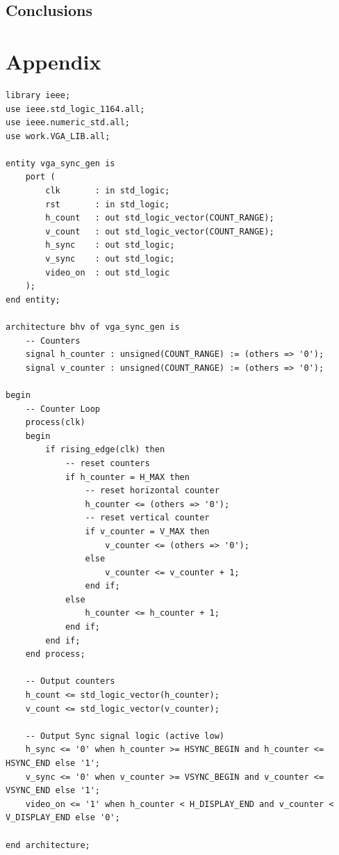 \documentclass{article}
\begin{document}
\subsection*{Conclusions}

\section*{Appendix}

\begin{lstlisting}[caption=VGA Sync Generator for Part 2, label=lst:vga-sync-gen-part-2]
library ieee;
use ieee.std_logic_1164.all;
use ieee.numeric_std.all;
use work.VGA_LIB.all;

entity vga_sync_gen is
    port (
        clk       : in std_logic;
        rst       : in std_logic;
        h_count   : out std_logic_vector(COUNT_RANGE);
        v_count   : out std_logic_vector(COUNT_RANGE);
        h_sync    : out std_logic;
        v_sync    : out std_logic;
        video_on  : out std_logic
    );
end entity;

architecture bhv of vga_sync_gen is
    -- Counters
    signal h_counter : unsigned(COUNT_RANGE) := (others => '0');
    signal v_counter : unsigned(COUNT_RANGE) := (others => '0');

begin
    -- Counter Loop
    process(clk)
    begin
        if rising_edge(clk) then
            -- reset counters
            if h_counter = H_MAX then
                -- reset horizontal counter
                h_counter <= (others => '0');
                -- reset vertical counter
                if v_counter = V_MAX then
                    v_counter <= (others => '0');
                else
                    v_counter <= v_counter + 1;
                end if;
            else
                h_counter <= h_counter + 1;
            end if;
        end if;
    end process;
    
    -- Output counters
    h_count <= std_logic_vector(h_counter);
    v_count <= std_logic_vector(v_counter);

    -- Output Sync signal logic (active low)
    h_sync <= '0' when h_counter >= HSYNC_BEGIN and h_counter <= HSYNC_END else '1';
    v_sync <= '0' when v_counter >= VSYNC_BEGIN and v_counter <= VSYNC_END else '1';
    video_on <= '1' when h_counter < H_DISPLAY_END and v_counter < V_DISPLAY_END else '0';

end architecture;
\end{lstlisting}
\end{document}
